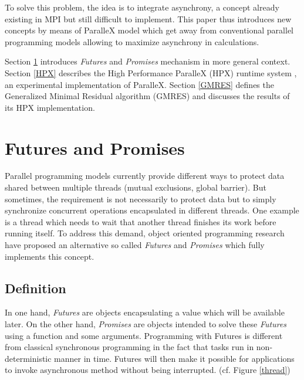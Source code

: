 \documentclass{llncs}
\begin{document}
To solve this problem, the idea is to integrate asynchrony, a concept already existing in MPI but still difficult to implement. This paper thus introduces new concepts by means of ParalleX model which get away from conventional parallel programming models allowing to maximize asynchrony in calculations.\smallskip

Section \ref{Futures} introduces \emph{Futures} and \emph{Promises} mechanism in more general context. Section \ref{HPX} describes the High Performance ParalleX (HPX) runtime system \cite{ParalleX}, an experimental implementation of ParalleX. Section \ref{GMRES} defines the Generalized Minimal Residual algorithm (GMRES) \cite{GMRES} and discusses the results of its HPX implementation.

\section{Futures and Promises}\label{Futures}
Parallel programming models currently provide different ways to protect data shared between multiple threads (mutual exclusions, global barrier). But sometimes, the requirement is not necessarily to protect data but to simply synchronize concurrent operations encapsulated in different threads. One example is a thread which needs to wait that another thread finishes its work before running itself. To address this demand, object oriented programming research have proposed an alternative so called \emph{Futures} and \emph{Promises} \cite{Futures1} \cite{Futures2} which fully implements this concept.

\subsection{Definition}
In one hand, \emph{Futures} are objects encapsulating a value which will be available later. On the other hand, \emph{Promises} are objects intended to solve these \emph{Futures} using a function and some arguments. Programming with Futures is different from classical synchronous programming in the fact that tasks run in non-deterministic manner in time. Futures will then make it possible for applications to invoke asynchronous method without being interrupted. (cf. Figure \ref{thread})
\end{document}
